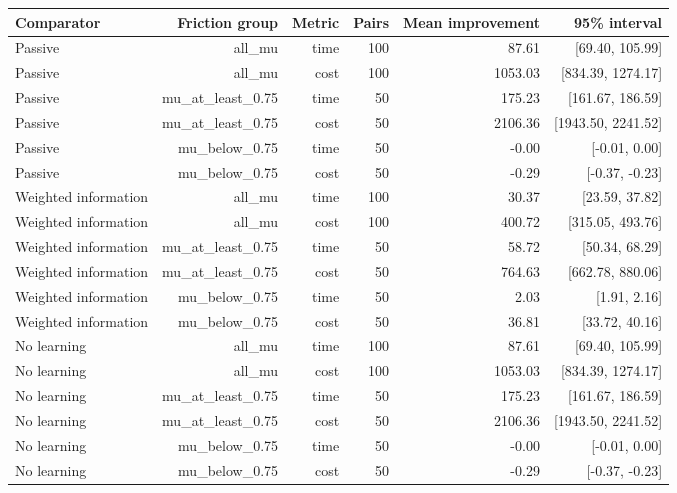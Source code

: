 \begin{tabular}{lrrrrr}
\toprule
Comparator & Friction group & Metric & Pairs & Mean improvement & 95\% interval \\
\midrule
Passive & all\_mu & time & 100 & 87.61 & [69.40, 105.99] \\
Passive & all\_mu & cost & 100 & 1053.03 & [834.39, 1274.17] \\
Passive & mu\_at\_least\_0.75 & time & 50 & 175.23 & [161.67, 186.59] \\
Passive & mu\_at\_least\_0.75 & cost & 50 & 2106.36 & [1943.50, 2241.52] \\
Passive & mu\_below\_0.75 & time & 50 & -0.00 & [-0.01, 0.00] \\
Passive & mu\_below\_0.75 & cost & 50 & -0.29 & [-0.37, -0.23] \\
Weighted information & all\_mu & time & 100 & 30.37 & [23.59, 37.82] \\
Weighted information & all\_mu & cost & 100 & 400.72 & [315.05, 493.76] \\
Weighted information & mu\_at\_least\_0.75 & time & 50 & 58.72 & [50.34, 68.29] \\
Weighted information & mu\_at\_least\_0.75 & cost & 50 & 764.63 & [662.78, 880.06] \\
Weighted information & mu\_below\_0.75 & time & 50 & 2.03 & [1.91, 2.16] \\
Weighted information & mu\_below\_0.75 & cost & 50 & 36.81 & [33.72, 40.16] \\
No learning & all\_mu & time & 100 & 87.61 & [69.40, 105.99] \\
No learning & all\_mu & cost & 100 & 1053.03 & [834.39, 1274.17] \\
No learning & mu\_at\_least\_0.75 & time & 50 & 175.23 & [161.67, 186.59] \\
No learning & mu\_at\_least\_0.75 & cost & 50 & 2106.36 & [1943.50, 2241.52] \\
No learning & mu\_below\_0.75 & time & 50 & -0.00 & [-0.01, 0.00] \\
No learning & mu\_below\_0.75 & cost & 50 & -0.29 & [-0.37, -0.23] \\
\bottomrule
\end{tabular}
